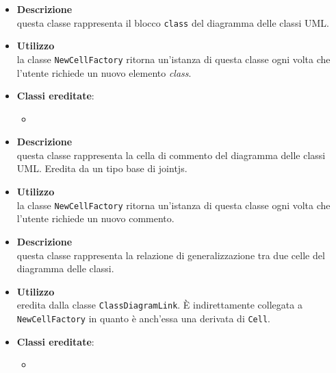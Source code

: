\label{\nogloxy{swedesigner::client::model::celltypes::class::HxClass}}
\begin{itemize}
\item \textbf{Descrizione}\\
questa classe rappresenta il blocco \texttt{class} del diagramma delle classi UML.
\item \textbf{Utilizzo}\\
la classe \texttt{NewCellFactory} ritorna un'istanza di questa classe ogni volta che l'utente richiede un nuovo elemento \emph{class}.
\item \textbf{Classi ereditate}:
\begin{itemize}
\item \hyperref[\nogloxy{swedesigner::client::model::celltypes::class::ClassDiagramElement}]{}
\end{itemize}
\end{itemize}

\label{\nogloxy{swedesigner::client::model::celltypes::class::HxComment}}
\begin{itemize}
\item \textbf{Descrizione}\\
questa classe rappresenta la cella di commento del diagramma delle classi UML. Eredita da un tipo base di jointjs.
\item \textbf{Utilizzo}\\
la classe \texttt{NewCellFactory} ritorna un'istanza di questa classe ogni volta che l'utente richiede un nuovo commento.
\end{itemize}

\label{\nogloxy{swedesigner::client::model::celltypes::class::HxGeneralization}}
\begin{itemize}
\item \textbf{Descrizione}\\
questa classe rappresenta la relazione di generalizzazione tra due celle del diagramma delle classi.
\item \textbf{Utilizzo}\\
eredita dalla classe \texttt{ClassDiagramLink}. È indirettamente collegata a \texttt{NewCellFactory} in quanto è anch'essa una derivata di \texttt{Cell}.
\item \textbf{Classi ereditate}:
\begin{itemize}
\item \hyperref[\nogloxy{swedesigner::client::model::celltypes::class::ClassDiagramLink}]{}
\end{itemize}
\end{itemize}

